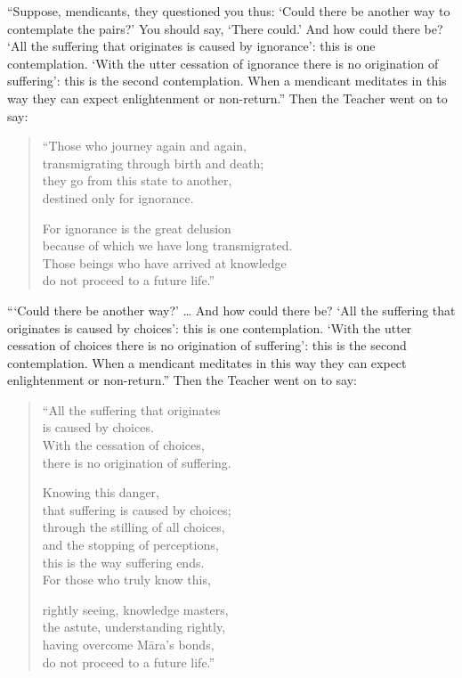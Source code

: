\documentclass[12pt,openany]{book}%
\begin{document}
“Suppose, mendicants, they questioned you thus: ‘Could there be another way to contemplate the pairs?’ You should say, ‘There could.’ And how could there be? ‘All the suffering that originates is caused by ignorance’: this is one contemplation. ‘With the utter cessation of ignorance there is no origination of suffering’: this is the second contemplation. When a mendicant meditates in this way they can expect enlightenment or non-return.” Then the Teacher went on to say: 

\begin{verse}%
“Those who journey again and again, \\
transmigrating through birth and death; \\
they go from this state to another, \\
destined only for ignorance. 

For ignorance is the great delusion \\
because of which we have long transmigrated. \\
Those beings who have arrived at knowledge \\
do not proceed to a future life.” 

%
\end{verse}

“‘Could there be another way?’ … And how could there be? ‘All the suffering that originates is caused by choices’: this is one contemplation. ‘With the utter cessation of choices there is no origination of suffering’: this is the second contemplation. When a mendicant meditates in this way they can expect enlightenment or non-return.” Then the Teacher went on to say: 

\begin{verse}%
“All the suffering that originates \\
is caused by choices. \\
With the cessation of choices, \\
there is no origination of suffering. 

Knowing this danger, \\
that suffering is caused by choices; \\
through the stilling of all choices, \\
and the stopping of perceptions, \\
this is the way suffering ends. \\
For those who truly know this, 

rightly seeing, knowledge masters, \\
the astute, understanding rightly, \\
having overcome \textsanskrit{Māra}’s bonds, \\
do not proceed to a future life.” 

%
\end{verse}
\end{document}
